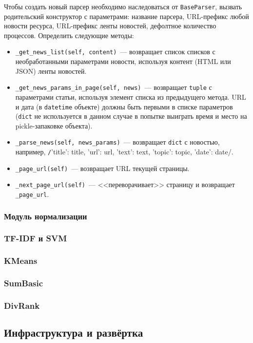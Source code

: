 \documentclass[a4paper, 14pt]{extarticle}
\begin{document}
Чтобы создать новый парсер необходимо наследоваться от \texttt{BaseParser}, вызвать родительский конструктор с параметрами: название парсера, URL-префикс любой новости ресурса, URL-префикс ленты новостей, дефолтное количество процессов. Определить следующие методы:
\begin{itemize}
	\item \texttt{\_get\_news\_list(self, content)}~--- возвращает список списков с необработанными параметрами новости, используя контент (HTML или JSON) ленты новостей.
	\item \texttt{\_get\_news\_params\_in\_page(self, news)}~--- возвращает \texttt{tuple} с параметрами статьи, используя элемент списка из предыдущего метода. URL и дата (в \texttt{datetime} объекте) должны быть первыми в списке параметров (\texttt{dict} не используется в данном случае в попытке выиграть время и место на pickle-запаковке объекта).
	\item \texttt{\_parse\_news(self, news\_params)}~--- возвращает \texttt{dict} с новостью, например, \texttt/{'title': title, 'url': url, 'text': text, 'topic': topic, 'date': date}/.
	\item \texttt{\_page\_url(self)}~--- возвращает URL текущей страницы.
	\item \texttt{\_next\_page\_url(self)}~--- <<переворачивает>> страницу и возвращает \texttt{\_page\_url}.
\end{itemize}



\subsubsection{Модуль нормализации}
\subsubsection{TF-IDF и SVM}
\subsubsection{KMeans}
\subsubsection{SumBasic}
\subsubsection{DivRank}

\subsection{Инфраструктура и развёртка}
\end{document}
